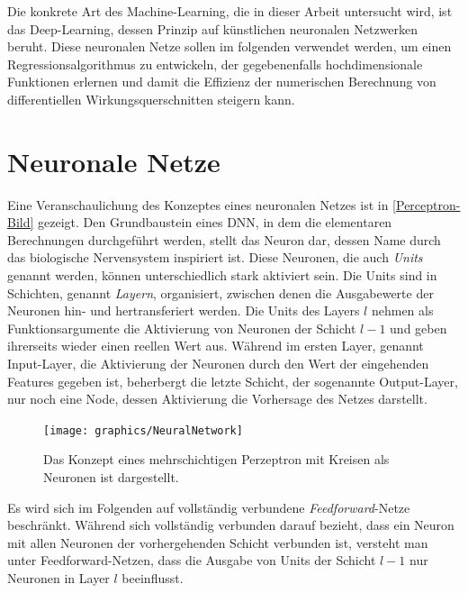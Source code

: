 Die konkrete Art des Machine-Learning, die in dieser Arbeit untersucht wird, ist das Deep-Learning, dessen Prinzip auf künstlichen neuronalen Netzwerken beruht. Diese neuronalen Netze sollen im folgenden verwendet werden, um einen Regressionsalgorithmus zu entwickeln, der gegebenenfalls hochdimensionale Funktionen erlernen und damit die Effizienz der numerischen Berechnung von differentiellen Wirkungsquerschnitten steigern kann. 
\section{Neuronale Netze}
Eine Veranschaulichung des Konzeptes eines neuronalen Netzes ist in \textsf{\autoref{Perceptron-Bild}} gezeigt.
Den Grundbaustein eines DNN, in dem die elementaren Berechnungen durchgeführt werden, stellt das Neuron dar, dessen Name durch das biologische Nervensystem inspiriert ist.
Diese Neuronen, die auch \textit{Units} genannt werden, können unterschiedlich stark aktiviert sein. Die Units sind in Schichten, genannt \textit{Layern}, organisiert, zwischen denen die Ausgabewerte der Neuronen hin- und hertransferiert werden. Die Units des Layers $l$ nehmen als Funktionsargumente die Aktivierung von Neuronen der Schicht $l-1$ und geben ihrerseits wieder einen reellen Wert aus. Während im ersten Layer, genannt Input-Layer, die Aktivierung der Neuronen durch den Wert der eingehenden Features gegeben ist, beherbergt die letzte Schicht, der sogenannte Output-Layer, nur noch eine Node, dessen Aktivierung die Vorhersage des Netzes darstellt. 

\begin{figure}
	\texttt{[image: graphics/NeuralNetwork]}
	\caption{Das Konzept eines mehrschichtigen Perzeptron \cite{Perceptron} mit Kreisen als Neuronen ist dargestellt.}
	
	\label{Perceptron-Bild}
\end{figure}
Es wird sich im Folgenden auf vollständig verbundene \textit{Feedforward}-Netze beschränkt. Während sich vollständig verbunden darauf bezieht, dass ein Neuron mit allen Neuronen der vorhergehenden Schicht verbunden ist, versteht man unter Feedforward-Netzen, dass die Ausgabe von Units der Schicht $l-1$ nur Neuronen in Layer $l$ beeinflusst.

